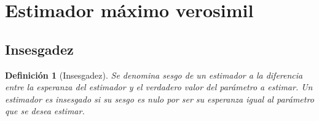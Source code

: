 \documentclass[a4paper, 10pt]{article} %
\newtheorem{definition}{Definición}[section]
\begin{document}
\section{Estimador máximo verosimil}

\subsection{Insesgadez}
\begin{definition}[Insesgadez]
Se denomina sesgo de un estimador a la diferencia entre la esperanza del estimador y el verdadero valor del parámetro a estimar. Un estimador es insesgado si su sesgo es nulo por ser su esperanza igual al parámetro que se desea estimar.
\end{definition}

\end{document}
